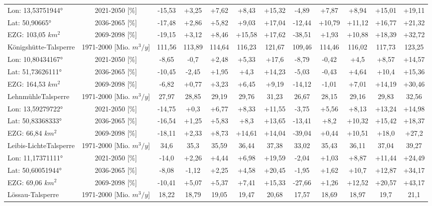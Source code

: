 \begin{longtable}{@{\extracolsep{\fill}}lc|ccccc||ccccc}
\cline{2-12} 
Lon: 13,53751944° & 2021-2050 [\%]  & -15,53 & +3,25 & +7,62 & +8,43 & +15,32 & -4,89 & +7,87 & +8,94 & +15,01 & +19,11\\ 
Lat: 50,90665° & 2036-2065 [\%]  & -17,48 & +2,86 & +5,82 & +9,03 & +17,04 & -12,44 & +10,79 & +11,12 & +16,77 & +21,32\\ 
EZG: 103,05 $km^2$ & 2069-2098 [\%]  & -19,15 & +3,12 & +8,46 & +15,58 & +17,62 & -38,51 & +1,93 & +10,88 & +18,39 & +32,72\\ 
\hline 
Königshütte-Talsperre & 1971-2000 [Mio. $m^3/y$]  & 111,56 & 113,89 & 114,64 & 116,23 & 121,67 & 109,46 & 114,46 & 116,02 & 117,73 & 123,25\\ 
\cline{2-12} 
Lon: 10,80434167° & 2021-2050 [\%]  & -8,65 & -0,7 & +2,48 & +5,33 & +17,6 & -8,79 & -0,42 & +4,5 & +8,57 & +14,57\\ 
Lat: 51,73626111° & 2036-2065 [\%]  & -10,45 & -2,45 & +1,95 & +4,3 & +14,23 & -5,03 & -0,43 & +4,64 & +10,4 & +15,36\\ 
EZG: 164,53 $km^2$ & 2069-2098 [\%]  & -6,82 & +0,77 & +3,23 & +6,45 & +9,19 & -14,12 & -1,01 & +7,01 & +14,19 & +30,46\\ 
\hline 
LehnmühleTalsperre & 1971-2000 [Mio. $m^3/y$]  & 27,97 & 28,85 & 29,19 & 29,76 & 31,23 & 26,67 & 28,15 & 29,16 & 29,83 & 32,56\\ 
\cline{2-12} 
Lon: 13,59279722° & 2021-2050 [\%]  & -14,75 & +0,3 & +6,77 & +8,33 & +11,55 & -3,75 & +5,56 & +8,13 & +13,24 & +14,98\\ 
Lat: 50,83368333° & 2036-2065 [\%]  & -16,54 & +1,25 & +5,83 & +8,3 & +13,65 & -13,41 & +8,2 & +10,32 & +15,42 & +18,37\\ 
EZG: 66,84 $km^2$ & 2069-2098 [\%]  & -18,11 & +2,33 & +8,73 & +14,61 & +14,04 & -39,04 & +0,44 & +10,51 & +18,0 & +27,2\\ 
\hline 
Leibis-LichteTalsperre & 1971-2000 [Mio. $m^3/y$]  & 34,6 & 35,3 & 35,59 & 36,44 & 37,38 & 33,02 & 35,43 & 36,11 & 37,04 & 39,27\\ 
\cline{2-12} 
Lon: 11,17371111° & 2021-2050 [\%]  & -14,0 & +2,26 & +4,44 & +6,98 & +19,59 & -2,04 & +1,03 & +8,87 & +11,44 & +24,49\\ 
Lat: 50,60051944° & 2036-2065 [\%]  & -8,08 & -1,12 & +2,25 & +4,58 & +20,45 & -1,95 & +1,62 & +10,7 & +12,87 & +34,17\\ 
EZG: 69,06 $km^2$ & 2069-2098 [\%]  & -10,41 & +5,07 & +5,37 & +7,41 & +15,33 & -27,66 & +1,26 & +12,52 & +20,57 & +43,17\\ 
\hline 
Lössau-Talsperre & 1971-2000 [Mio. $m^3/y$]  & 18,22 & 18,79 & 19,05 & 19,47 & 20,68 & 17,57 & 18,69 & 18,97 & 19,7 & 21,1\\ 

\end{longtable}

